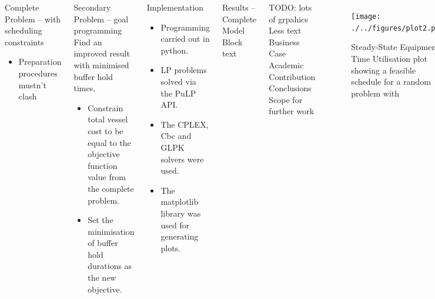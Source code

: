 \documentclass[final]{beamer}
\begin{document}
\begin{frame}[t]
\begin{columns}[t]
\begin{block}{\huge Complete Problem -- with scheduling
                    constraints}
\begin{itemize}
                            time.
                        \item Preparation procedures mustn't clash
                    \end{itemize}
                \end{block}
                \begin{block}{\huge Secondary Problem -- goal programming}
                    Find an improved result with minimised buffer hold times.
                    \begin{itemize}
                        \item Constrain total vessel cost to be equal to the
                            objective function value from the complete problem.
                        \item Set the minimisation of buffer hold durations as
                            the new objective.
                    \end{itemize}
                \end{block}
                \begin{block}{\huge Implementation}
                    \begin{itemize}
                        \item Programming carried out in python.
                        \item LP problems solved via the PuLP API.
                        \item The CPLEX, Cbc and GLPK solvers were used.
                        \item The matplotlib library was used for generating
                            plots.
                    \end{itemize}
                \end{block}
                \begin{block}{\huge Results -- Complete Model}
                    Block text
                \end{block}
                TODO: lots of grpahics
                Less text
                Business Case
                Academic Contribution
                Conclusions
                Scope for further work
                \begin{figure}
                    \texttt{[image: ./../figures/plot2.pdf]}
                    \captionsetup{justification=centering}
                    \caption{\Large Steady-State Equipment Time Utilisation
                    plot showing a feasible schedule for a random problem with
}
\end{figure}
\end{columns}
\end{frame}
\end{document}
